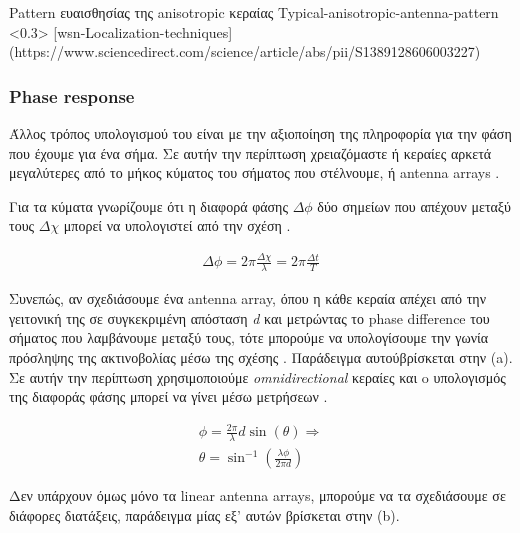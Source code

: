{Pattern ευαισθησίας της anisotropic κεραίας}%
{Typical-anisotropic-antenna-pattern}%
<0.3>%
[wsn-Localization-techniques]%
(https://www.sciencedirect.com/science/article/abs/pii/S1389128606003227) %

\subsubsection{Phase response}
Άλλος τρόπος υπολογισμού του  είναι με την αξιοποίηση της πληροφορία για την φάση που έχουμε για ένα σήμα. Σε αυτήν την περίπτωση
χρειαζόμαστε ή κεραίες αρκετά μεγαλύτερες από το μήκος κύματος του σήματος που στέλνουμε, ή antenna arrays \cite{wsn-Localization-techniques}. 

Για τα κύματα γνωρίζουμε ότι η διαφορά φάσης $\Delta \phi$ δύο σημείων που απέχουν  
μεταξύ τους $\Delta \chi$ μπορεί να υπολογιστεί από την σχέση  \cite{phase-difference}.

\begin{align}
	\Delta \phi = 2\pi\frac{\Delta \chi}{\lambda} = 2\pi\frac{\Delta t}{T} \label{eq:phase-different-general}
\end{align}

Συνεπώς, αν σχεδιάσουμε ένα antenna array, όπου η κάθε κεραία απέχει από την γειτονική της σε συγκεκριμένη απόσταση \emph{d} και μετρώντας 
το phase difference του σήματος που λαμβάνουμε μεταξύ τους, τότε μπορούμε να υπολογίσουμε την γωνία πρόσληψης της ακτινοβολίας μέσω της 
σχέσης  \cite{wsn-Localization-techniques} \cite{youtube-phase-difference-equation}. Παράδειγμα αυτού\udot βρίσκεται στην  (a).
Σε αυτήν την περίπτωση χρησιμοποιούμε \emph{omnidirectional} κεραίες και o υπολογισμός της διαφοράς φάσης μπορεί να γίνει
μέσω μετρήσεων .

\begin{gather} 
	\phi = \frac{2\pi}{\lambda}d\sin(\theta) \Rightarrow \nonumber \\[2pt]
	\theta = \sin^{-1}\left(\frac{\lambda \phi}{2\pi d}\right) \label{eq:aoa-equation}
\end{gather}

Δεν υπάρχουν όμως μόνο τα linear antenna arrays, μπορούμε να τα σχεδιάσουμε σε διάφορες διατάξεις, 
παράδειγμα μίας εξ' αυτών βρίσκεται στην  (b).

